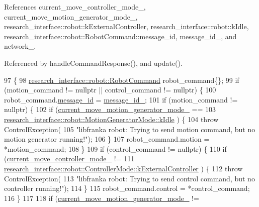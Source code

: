References current\+\_\+move\+\_\+controller\+\_\+mode\+\_\+, current\+\_\+move\+\_\+motion\+\_\+generator\+\_\+mode\+\_\+, research\+\_\+interface\+::robot\+::k\+External\+Controller, research\+\_\+interface\+::robot\+::k\+Idle, research\+\_\+interface\+::robot\+::\+Robot\+Command\+::message\+\_\+id, message\+\_\+id\+\_\+, and network\+\_\+.



Referenced by handle\+Command\+Response(), and update().


\begin{DoxyCode}
97                                                                            \{
98   \hyperlink{structresearch__interface_1_1robot_1_1RobotCommand}{research\_interface::robot::RobotCommand} robot\_command\{\};
99   \textcolor{keywordflow}{if} (motion\_command != \textcolor{keyword}{nullptr} || control\_command != \textcolor{keyword}{nullptr}) \{
100     robot\_command.\hyperlink{structresearch__interface_1_1robot_1_1RobotCommand_a0a7700d777ee45295f3c9c93c663e225}{message\_id} = \hyperlink{classfranka_1_1Robot_1_1Impl_aed154fce2f3a44a60b7397405974d395}{message\_id\_};
101     \textcolor{keywordflow}{if} (motion\_command != \textcolor{keyword}{nullptr}) \{
102       \textcolor{keywordflow}{if} (\hyperlink{classfranka_1_1Robot_1_1Impl_a2fecb29212c55738e284b2ba8249ad5c}{current\_move\_motion\_generator\_mode\_} ==
103           \hyperlink{namespaceresearch__interface_1_1robot_abd2451eb963a1843f1eb066ebd4b06e8af5137a026a4b2f3b1c8a21cfc60dd14b}{research\_interface::robot::MotionGeneratorMode::kIdle}
      ) \{
104         \textcolor{keywordflow}{throw} ControlException(
105             \textcolor{stringliteral}{"libfranka robot: Trying to send motion command, but no motion generator running!"});
106       \}
107       robot\_command.motion = *motion\_command;
108     \}
109     \textcolor{keywordflow}{if} (control\_command != \textcolor{keyword}{nullptr}) \{
110       \textcolor{keywordflow}{if} (\hyperlink{classfranka_1_1Robot_1_1Impl_ab5d1a7e855dae2453635da08440c375e}{current\_move\_controller\_mode\_} !=
111           \hyperlink{namespaceresearch__interface_1_1robot_a54ee0c8bfefd2ee8a46837ca6d2b1213aae18ec698c6d2260b411166de51e86fe}{research\_interface::robot::ControllerMode::kExternalController}
      ) \{
112         \textcolor{keywordflow}{throw} ControlException(
113             \textcolor{stringliteral}{"libfranka robot: Trying to send control command, but no controller running!"});
114       \}
115       robot\_command.control = *control\_command;
116     \}
117 
118     \textcolor{keywordflow}{if} (\hyperlink{classfranka_1_1Robot_1_1Impl_a2fecb29212c55738e284b2ba8249ad5c}{current\_move\_motion\_generator\_mode\_} !=

\end{DoxyCode}

